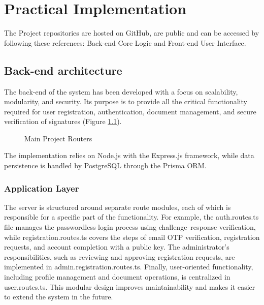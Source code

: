 \chapter{Practical Implementation}
The Project repositories are hosted on GitHub, are public and can be accessed by following these references: Back-end Core Logic\cite{alexei_pavlovschii_blocksign_nodate} and Front-end User Interface\cite{vladimir_vitcovschii_blocksign_nodate}.

\section{Back-end architecture}
The back-end of the system has been developed with a focus on scalability, modularity, and security. Its purpose is to provide all the critical functionality required for user registration, authentication, document management, and secure verification of signatures (Figure \ref{main-project-routers}). 

\begin{figure}[H]
    \centering
    \caption{Main Project Routers}
    \label{main-project-routers}
\end{figure}

The implementation relies on Node.js with the Express.js framework, while data persistence is handled by PostgreSQL through the Prisma ORM.

\subsection{Application Layer}
The server is structured around separate route modules, each of which is responsible for a specific part of the functionality. For example, the auth.routes.ts file manages the passwordless login process using challenge–response verification, while registration.routes.ts covers the steps of email OTP verification, registration requests, and account completion with a public key. The administrator’s responsibilities, such as reviewing and approving registration requests, are implemented in admin.registration.routes.ts. Finally, user-oriented functionality, including profile management and document operations, is centralized in user.routes.ts. This modular design improves maintainability and makes it easier to extend the system in the future.

